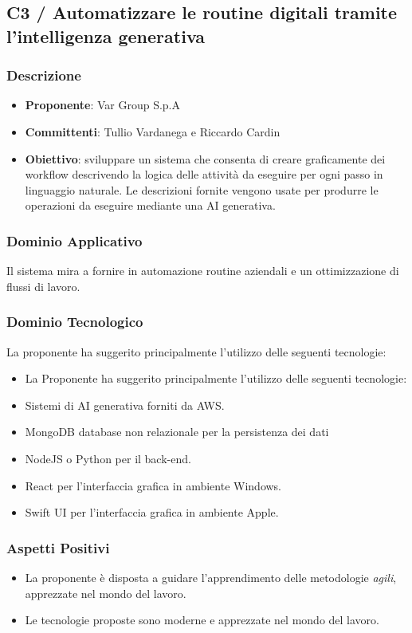 \documentclass[a4paper, 12pt]{article}
\begin{document}
\subsection{C3 / Automatizzare le routine digitali tramite l’intelligenza generativa}

\subsubsection{Descrizione}
\begin{itemize}
    \item \textbf{Proponente}: Var Group S.p.A
    \item \textbf{Committenti}: Tullio Vardanega e Riccardo Cardin
    \item \textbf{Obiettivo}: sviluppare un sistema che consenta di creare graficamente dei workflow descrivendo la logica delle attività da eseguire per ogni passo in linguaggio naturale.
    Le descrizioni fornite vengono usate per produrre le operazioni da eseguire mediante una AI generativa.    
\end{itemize}

\subsubsection{Dominio Applicativo}
Il sistema mira a fornire in automazione routine aziendali e un ottimizzazione di flussi di lavoro.

\subsubsection{Dominio Tecnologico}
La proponente ha suggerito principalmente l'utilizzo delle seguenti tecnologie:
\begin{itemize}
    \item La Proponente ha suggerito principalmente l’utilizzo delle seguenti tecnologie:
    \item Sistemi di AI generativa forniti da AWS.
    \item MongoDB database non relazionale per la persistenza dei dati 
    \item NodeJS o Python per il back-end.
    \item React per l’interfaccia grafica in ambiente Windows.
    \item Swift UI per l’interfaccia grafica in ambiente Apple.
\end{itemize}

\subsubsection{Aspetti Positivi}
\begin{itemize}
    \item La proponente è disposta a guidare l’apprendimento delle metodologie \textit{agili}, apprezzate nel mondo del lavoro.
    \item Le tecnologie proposte sono moderne e apprezzate nel mondo del lavoro.
\end{itemize}
\end{document}
